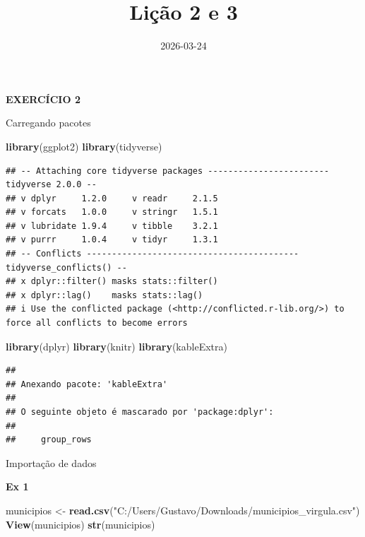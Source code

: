 \documentclass[
]{article}
\title{Lição 2 e 3}
\author{}
\date{\vspace{-2.5em}2026-03-24}
\newenvironment{Shaded}{\begin{snugshade}}{\end{snugshade}}
\newcommand{\FunctionTok}[1]{\textcolor[rgb]{0.13,0.29,0.53}{\textbf{#1}}}
\newcommand{\NormalTok}[1]{#1}
\newcommand{\OtherTok}[1]{\textcolor[rgb]{0.56,0.35,0.01}{#1}}
\newcommand{\StringTok}[1]{\textcolor[rgb]{0.31,0.60,0.02}{#1}}
\begin{document}
\maketitle

\textbf{EXERCÍCIO 2}

Carregando pacotes

\begin{Shaded}
\begin{Highlighting}[]
\FunctionTok{library}\NormalTok{(ggplot2)}
\FunctionTok{library}\NormalTok{(tidyverse)}
\end{Highlighting}
\end{Shaded}

\begin{verbatim}
## -- Attaching core tidyverse packages ------------------------ tidyverse 2.0.0 --
## v dplyr     1.2.0     v readr     2.1.5
## v forcats   1.0.0     v stringr   1.5.1
## v lubridate 1.9.4     v tibble    3.2.1
## v purrr     1.0.4     v tidyr     1.3.1
## -- Conflicts ------------------------------------------ tidyverse_conflicts() --
## x dplyr::filter() masks stats::filter()
## x dplyr::lag()    masks stats::lag()
## i Use the conflicted package (<http://conflicted.r-lib.org/>) to force all conflicts to become errors
\end{verbatim}

\begin{Shaded}
\begin{Highlighting}[]
\FunctionTok{library}\NormalTok{(dplyr)}
\FunctionTok{library}\NormalTok{(knitr)}
\FunctionTok{library}\NormalTok{(kableExtra)}
\end{Highlighting}
\end{Shaded}

\begin{verbatim}
## 
## Anexando pacote: 'kableExtra'
## 
## O seguinte objeto é mascarado por 'package:dplyr':
## 
##     group_rows
\end{verbatim}

Importação de dados

\textbf{Ex 1}

\begin{Shaded}
\begin{Highlighting}[]
\NormalTok{municipios }\OtherTok{\textless{}{-}} \FunctionTok{read.csv}\NormalTok{(}\StringTok{"C:/Users/Gustavo/Downloads/municipios\_virgula.csv"}\NormalTok{)}
\FunctionTok{View}\NormalTok{(municipios)}
\FunctionTok{str}\NormalTok{(municipios)}
\end{Highlighting}
\end{Shaded}
\end{document}
